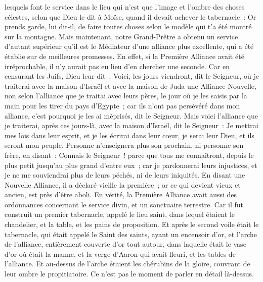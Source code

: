 \begin{multicols}{2}
lesquels font le service dans le lieu qui n'est que l'image et l'ombre des choses célestes, selon que Dieu le dit à Moïse, quand il devait achever le tabernacle~: Or prends garde, lui dit-il, de faire toutes choses selon le modèle qui t'a été montré sur la montagne.
Mais maintenant, notre Grand-Prêtre a obtenu un service d'autant supérieur qu'il est le Médiateur d'une alliance plus excellente, qui a été établie sur de meilleures promesses.
En effet, si la Première Alliance avait été irréprochable, il n'y aurait pas eu lieu d'en chercher une seconde.
Car en censurant les Juifs, Dieu leur dit~: Voici, les jours viendront, dit le Seigneur, où je traiterai avec la maison d'Israël et avec la maison de Juda une Alliance Nouvelle,
non selon l'alliance que je traitai avec leurs pères, le jour où je les saisis par la main pour les tirer du pays d'Egypte~; car ils n'ont pas persévéré dans mon alliance, c'est pourquoi je les ai méprisés, dit le Seigneur.
Mais voici l'alliance que je traiterai, après ces jours-là, avec la maison d'Israël, dit le Seigneur~: Je mettrai mes lois dans leur esprit, et je les écrirai dans leur cœur, je serai leur Dieu, et ils seront mon peuple.
Personne n'enseignera plus son prochain, ni personne son frère, en disant~: Connais le Seigneur~! parce que tous me connaîtront, depuis le plus petit jusqu'au plus grand d'entre eux~;
car je pardonnerai leurs injustices, et je ne me souviendrai plus de leurs péchés, ni de leurs iniquités.
En disant une Nouvelle Alliance, il a déclaré vieille la première~; or ce qui devient vieux et ancien, est près d'être aboli.
\VerseOne{}En vérité, la Première Alliance avait aussi des ordonnances concernant le service divin, et un sanctuaire terrestre.
Car il fut construit un premier tabernacle, appelé le lieu saint, dans lequel étaient le chandelier, et la table, et les pains de proposition.
Et après le second voile était le tabernacle, qui était appelé le Saint des saints,
ayant un encensoir d'or, et l'arche de l'alliance, entièrement couverte d'or tout autour, dans laquelle était le vase d'or où était la manne, et la verge d'Aaron qui avait fleuri, et les tables de l'alliance.
Et au-dessus de l'arche étaient les chérubins de la gloire, couvrant de leur ombre le propitiatoire. Ce n'est pas le moment de parler en détail là-dessus.

\end{multicols}
